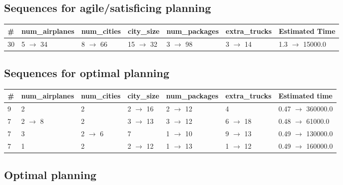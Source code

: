 \documentclass{article}
\begin{document}
                         \subsection*{Sequences for agile/satisficing planning}

                        \begin{center}
                        \begin{tabular}{@{}l|l|l|l|l|l|l@{}}
                        \# & num\_airplanes & num\_cities & city\_size & num\_packages & extra\_trucks & Estimated Time\\\midrule
                        30&5 $\rightarrow$ 34&8 $\rightarrow$ 66&15 $\rightarrow$ 32&3 $\rightarrow$ 98&3 $\rightarrow$ 14&1.3 $\rightarrow$ 15000.0
                        \end{tabular}
                        \end{center}
                    
                            \subsection*{Sequences for optimal planning}

                            \begin{center}
                            \begin{tabular}{@{}l|l|l|l|l|l|l@{}}
                            \# & num\_airplanes & num\_cities & city\_size & num\_packages & extra\_trucks & Estimated time\\\midrule
                            9&2&2&2 $\rightarrow$ 16&2 $\rightarrow$ 12&4&0.47 $\rightarrow$ 360000.0\\
7&2 $\rightarrow$ 8&2&3 $\rightarrow$ 13&3 $\rightarrow$ 12&6 $\rightarrow$ 18&0.48 $\rightarrow$ 61000.0\\
7&3&2 $\rightarrow$ 6&7&1 $\rightarrow$ 10&9 $\rightarrow$ 13&0.49 $\rightarrow$ 130000.0\\
7&1&2&2 $\rightarrow$ 12&1 $\rightarrow$ 13&1 $\rightarrow$ 12&0.49 $\rightarrow$ 160000.0
                            \end{tabular}
                            \end{center}
                    
                                \subsection*{Optimal planning}
                                
\end{document}
